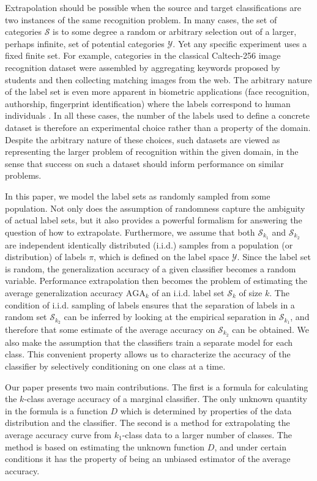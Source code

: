 \documentclass[twoside,11pt]{article}
\begin{document}
Extrapolation should be possible when the source and target
classifications are two instances of the same recognition problem.  In
many cases, the set of categories $\mathcal{S}$ is to some degree a
random or arbitrary selection out of a larger, perhaps infinite, set
of potential categories $\mathcal{Y}$. Yet any specific experiment
uses a fixed finite set.  For example, categories in the classical
Caltech-256 image recognition dataset \citep{griffin2007caltech} were
assembled by aggregating keywords proposed by students and then
collecting matching images from the web.  The arbitrary nature of the
label set is even more apparent in biometric applications (face
recognition, authorship, fingerprint identification) where the labels
correspond to human individuals \citep{togneri2011overview,
  stamatatos2014overview}.  In all these cases, the number of the
labels used to define a concrete dataset is therefore an experimental
choice rather than a property of the domain.  Despite the arbitrary
nature of these choices, such datasets are viewed as representing the
larger problem of recognition within the given domain, in the sense
that success on such a dataset should inform performance on similar
problems.

In this paper, we model the label sets as randomly sampled from some
population.  Not only does the assumption of randomness capture the
ambiguity of actual label sets, but it also provides a powerful
formalism for answering the question of how to extrapolate.
Furthermore, we assume that both $\mathcal{S}_{k_1}$ and
$\mathcal{S}_{k_2}$ are independent identically distributed (i.i.d.)
samples from a population (or distribution) of labels $ \pi$, which is
defined on the label space $\mathcal{Y}$.  Since the label set is
random, the generalization accuracy of a given classifier becomes a
random variable.  Performance extrapolation then becomes the problem
of estimating the average generalization accuracy $\text{AGA}_k$ of an
i.i.d. label set $\mathcal{S}_k$ of size $k$.  The condition of
i.i.d. sampling of labels ensures that the separation of labels in a
random set $\mathcal{S}_{k_2}$ can be inferred by looking at the
empirical separation in $\mathcal{S}_{k_1}$, and therefore that some
estimate of the average accuracy on $\mathcal{S}_{k_2}$ can be
obtained.  We also make the assumption that the classifiers train a
separate model for each class.  This convenient property allows us to
characterize the accuracy of the classifier by selectively
conditioning on one class at a time.

Our paper presents two main contributions.  The first is a formula for
calculating the $k$-class average accuracy of a marginal classifier.
The only unknown quantity in the formula is a function ${D}$ which
is determined by properties of the data distribution and the
classifier.  The second is a method for extrapolating the average
accuracy curve from $k_1$-class data to a larger number of classes.
The method is based on estimating the unknown function ${D}$, and
under certain conditions it has the property of being an unbiased
estimator of the average accuracy.
\end{document}
